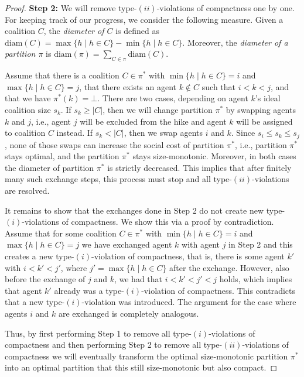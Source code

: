 \documentclass[a4paper]{article}
\newcommand{\set}[1]{\{#1\}}
\begin{document}
\begin{proof}
\textbf{Step 2:} We will remove type-$(ii)$-violations of compactness one by one. For keeping track of our progress, we consider the following measure.
Given a coalition $C$, the \emph{diameter of $C$} is defined as $\text{diam}(C)= \max\set{h \mid h\in C} - \min\set{h \mid h\in C}$. Moreover, the \emph{diameter of a partition $\pi$} is $\text{diam}(\pi)= \sum_{C\in\pi}\text{diam}(C)$. 

Assume that there is a coalition $C\in \pi^*$ with $\min\set{h \mid h \in C}=i$ and $\max\set{h \mid h\in C}=j$, that there exists an agent $k\not\in C$ such that $i<k<j$, and that we have $\pi^*(k) = \bot$. There are two cases, depending on agent $k$'s ideal coalition size $s_k$. If $s_k \geq |C|$, then we will change partition $\pi^*$ by swapping agents $k$ and $j$, i.e., agent $j$ will be excluded from the hike and agent $k$ will be assigned to coalition $C$ instead. If $s_k < |C|$, then we swap agents $i$ and $k$. Since $s_i \leq s_k \leq s_j$, none of those swaps can increase the social cost of partition $\pi^*$, i.e., partition $\pi^*$ stays optimal, and the partition $\pi^*$ stays size-monotonic. Moreover, in both cases the diameter of partition $\pi^*$ is strictly decreased. This implies that after finitely many such exchange steps, this process must stop and all type-$(ii)$-violations are resolved.  

It remains to show that the exchanges done in Step 2 do not create new type-$(i)$-violations of compactness. We show this via a proof by contradiction. Assume that for some coalition $C \in \pi^*$ with $\min\set{h \mid h \in C}=i$ and $\max\set{h \mid h\in C}=j$ we have exchanged agent $k$ with agent $j$ in Step 2 and this creates a new type-$(i)$-violation of compactness, that is, there is some agent $k'$ with $i<k'<j'$, where $j'=\max\set{h \mid h\in C}$ after the exchange. However, also before the exchange of $j$ and $k$, we had that $i<k'<j'<j$ holds, which implies that agent $k'$ already was a type-$(i)$-violation of compactness. This contradicts that a new type-$(i)$-violation was introduced. The argument for the case where agents $i$ and $k$ are exchanged is completely analogous.  

Thus, by first performing Step 1 to remove all type-$(i)$-violations of compactness and then performing Step 2 to remove all type-$(ii)$-violations of compactness we will eventually transform the optimal size-monotonic partition $\pi^*$ into an optimal partition that this still size-monotonic but also compact. 
\end{proof}
\end{document}
